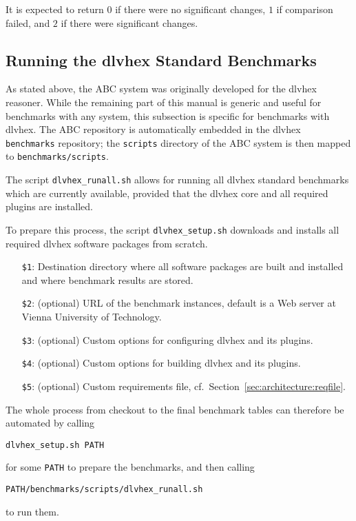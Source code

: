 \documentclass[a4paper]{article}
\newcommand{\dlvhex}{{\sc dlvhex}}
\newcommand{\abcs}{{ABC}}
\begin{document}
			It is expected to return $0$ if there were no significant changes,
			$1$ if comparison failed, and $2$ if there were significant changes.

		\subsection{Running the \dlvhex{} Standard Benchmarks}

			As stated above, the \abcs{} system was originally developed for the \dlvhex{} reasoner.
			While the remaining part of this manual is generic and useful for benchmarks with any system,
			this subsection is specific for benchmarks with \dlvhex{}.
			The \abcs{} repository is automatically embedded in the \dlvhex{} {\tt benchmarks} repository;
			the {\tt scripts} directory of the \abcs{} system is then mapped to {\tt benchmarks/scripts}.

			The script {\tt dlvhex\_runall.sh} allows for
			running all \dlvhex{} standard benchmarks which are currently available,
			provided that the {\sc dlvhex} core and all required plugins are installed.

			To prepare this process, the script {\tt dlvhex\_setup.sh} downloads and installs all required {\sc dlvhex} software packages
			from scratch.

			\medskip{}
			\begin{itemize}
				\item[{\tt \$1}:] Destination directory where all software packages are built and installed and where benchmark results are stored.
				\item[{\tt \$2}:] (optional) URL of the benchmark instances, default is a Web server at Vienna University of Technology.
				\item[{\tt \$3}:] (optional) Custom options for configuring {\sc dlvhex} and its plugins.
				\item[{\tt \$4}:] (optional) Custom options for building {\sc dlvhex} and its plugins.
				\item[{\tt \$5}:] (optional) Custom requirements file, cf.~Section~\ref{sec:architecture:reqfile}.				
			\end{itemize}

			The whole process from checkout to the final benchmark tables can therefore be automated by calling
			\begin{center}
				{\tt dlvhex\_setup.sh PATH}
			\end{center}
			for some {\tt PATH} to prepare the benchmarks, and then calling
			\begin{center}
				{\tt PATH/benchmarks/scripts/dlvhex\_runall.sh}
			\end{center}
			to run them.
\end{document}
